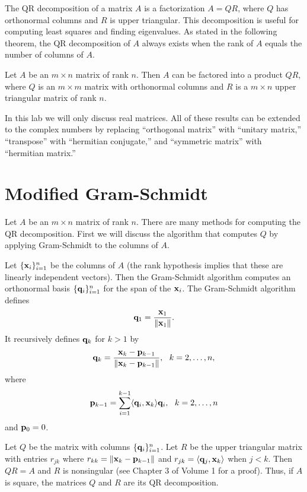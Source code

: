 \label{lab:QRdecomp}

The QR decomposition of a matrix $A$ is a factorization $A=QR$, where $Q$ has orthonormal columns and $R$ is upper triangular.
This decomposition is useful for computing least squares and finding eigenvalues.
As stated in the following theorem, the QR decomposition of $A$ always exists when the rank of $A$ equals the number of columns of $A$.
\begin{theorem}
Let $A$ be an $m\times n$ matrix of rank $n$.  Then $A$ can be
factored into a product $Q R$, where $Q$ is an $m\times m$ matrix
with orthonormal columns and $R$ is a $m \times n$ upper
triangular matrix of rank $n$.
\end{theorem}

In this lab we will only discuss real matrices. 
All of these results can be extended to the complex numbers by replacing ``orthogonal matrix'' with ``unitary matrix,'' ``transpose'' with ``hermitian conjugate,'' and ``symmetric matrix'' with ``hermitian matrix.''

\section*{Modified Gram-Schmidt}
Let $A$ be an $m \times n$ matrix of rank $n$.
There are many methods for computing the QR decomposition.
First we will discuss the algorithm that computes $Q$ by applying Gram-Schmidt to the columns of $A$.

Let $\{{\bf x}_i\}_{i=1}^n$ be the columns of $A$ (the rank hypothesis implies that these are linearly independent vectors).
Then the Gram-Schmidt algorithm computes an orthonormal basis $\{{\bf q}_i\}_{i=1}^n$ for the span of the ${\bf x}_i$. 
The Gram-Schmidt algorithm defines  \[ {\bf q}_1 = \frac{{\bf x}_1}{\left\lVert{\bf x}_1\right\rVert}.\]
It recursively defines ${\bf q}_k$ for $k>1$ by
\[
{\bf q}_{k} = \frac{{\bf x}_k - {\bf p}_{k-1}}{\|{\bf x}_k - {\bf p}_{k-1}\|}, \,\,\,\, k=2,\ldots,n,
\]
where
\[
{\bf p}_{k-1} = \sum_{i=1}^{k-1} \langle {\bf q}_i, {\bf x}_k\rangle {\bf q}_i, \,\,\,\, k=2, \ldots, n
\]
and ${\bf p}_0 = 0$. 


Let $Q$ be the matrix with columns $\{{\bf q}_i\}_{i=1}^n$. 
Let $R$ be the upper triangular matrix with entries $r_{jk}$ where $r_{kk} = \|{\bf x}_k-{\bf p}_{k-1}\|$ and $r_{j k} = \langle {\bf q}_j, {\bf x}_k\rangle$ when $j < k$. 
Then $QR=A$ and $R$ is nonsingular (see Chapter 3 of Volume 1 for a proof).
Thus, if $A$ is square, the matrices $Q$ and $R$ are its QR decomposition.


